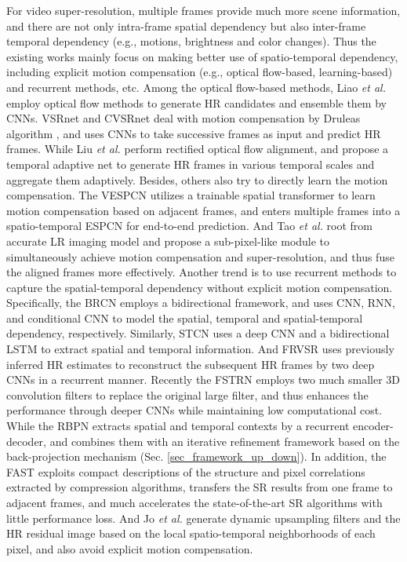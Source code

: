 {For video super-resolution, multiple frames provide much more scene information, and there are not only intra-frame spatial dependency but also inter-frame temporal dependency (e.g., motions, brightness and color changes).
Thus the existing works mainly focus on making better use of spatio-temporal dependency, including explicit motion compensation (e.g., optical flow-based, learning-based) and recurrent methods, etc.
Among the optical flow-based methods, Liao \textit{et al.}  employ optical flow methods to generate HR candidates and ensemble them by CNNs.
VSRnet  and CVSRnet  deal with motion compensation by Druleas algorithm , and uses CNNs to take successive frames as input and predict HR frames.
While Liu \textit{et al.}  perform rectified optical flow alignment, and propose a temporal adaptive net to generate HR frames in various temporal scales and aggregate them adaptively.
Besides, others also try to directly learn the motion compensation.
The VESPCN  utilizes a trainable spatial transformer  to learn motion compensation based on adjacent frames, and enters multiple frames into a spatio-temporal ESPCN  for end-to-end prediction.
And Tao \textit{et al.}  root from accurate LR imaging model and propose a sub-pixel-like module to simultaneously achieve motion compensation and super-resolution, and thus fuse the aligned frames more effectively.
Another trend is to use recurrent methods to capture the spatial-temporal dependency without explicit motion compensation.
Specifically, the BRCN  employs a bidirectional framework, and uses CNN, RNN, and conditional CNN to model the spatial, temporal and spatial-temporal dependency, respectively.
Similarly, STCN  uses a deep CNN and a bidirectional LSTM  to extract spatial and temporal information.
And FRVSR  uses previously inferred HR estimates to reconstruct the subsequent HR frames by two deep CNNs in a recurrent manner.
Recently the FSTRN  employs two much smaller 3D convolution filters to replace the original large filter, and thus enhances the performance through deeper CNNs while maintaining low computational cost.
While the RBPN  extracts spatial and temporal contexts by a recurrent encoder-decoder, and combines them with an iterative refinement framework based on the back-projection mechanism (Sec. \ref{sec_framework_up_down}).
In addition, the FAST  exploits compact descriptions of the structure and pixel correlations extracted by compression algorithms, transfers the SR results from one frame to adjacent frames, and much accelerates the state-of-the-art SR algorithms with little performance loss.  
And Jo \textit{et al.}  generate dynamic upsampling filters and the HR residual image based on the local spatio-temporal neighborhoods of each pixel, and also avoid explicit motion compensation.

}
